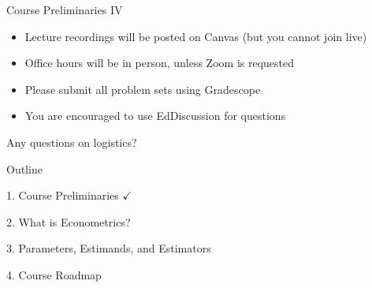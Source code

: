 \documentclass[11pt,english,handout]{beamer}
\begin{document}
\begin{frame}{Course Preliminaries IV}
\begin{itemize}
\item Lecture recordings will be posted on Canvas (but you cannot join live)
\vspace{0.1cm}
\item Office hours will be in person, unless Zoom is requested
\vspace{0.1cm}
\item Please submit all problem sets using Gradescope
\vspace{0.1cm}
\item You are encouraged to use EdDiscussion for questions
\end{itemize}
\pause{}
\vspace{0.5cm}
Any questions on logistics? 

\end{frame}

\begin{frame}{Outline}

1. Course Preliminaries $\checkmark$
\vspace{0.8cm}

2. What is Econometrics?
\vspace{0.8cm}

3. Parameters, Estimands, and Estimators
\vspace{0.8cm}

4. Course Roadmap

\end{frame}
\end{document}
